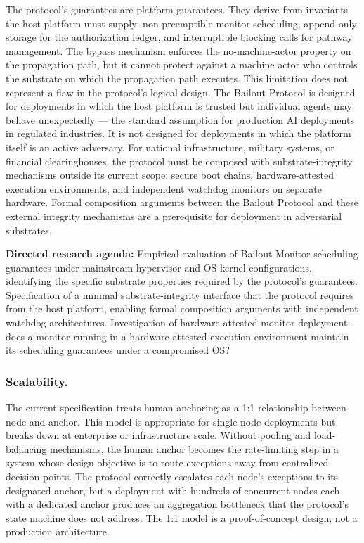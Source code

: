 The protocol's guarantees are platform guarantees. They derive from invariants the host platform must supply: non-preemptible monitor scheduling, append-only storage for the authorization ledger, and interruptible blocking calls for pathway management. The bypass mechanism enforces the no-machine-actor property on the propagation path, but it cannot protect against a machine actor who controls the substrate on which the propagation path executes. This limitation does not represent a flaw in the protocol's logical design. The Bailout Protocol is designed for deployments in which the host platform is trusted but individual agents may behave unexpectedly --- the standard assumption for production AI deployments in regulated industries. It is not designed for deployments in which the platform itself is an active adversary. For national infrastructure, military systems, or financial clearinghouses, the protocol must be composed with substrate-integrity mechanisms outside its current scope: secure boot chains, hardware-attested execution environments, and independent watchdog monitors on separate hardware. Formal composition arguments between the Bailout Protocol and these external integrity mechanisms are a prerequisite for deployment in adversarial substrates.

\textbf{Directed research agenda:} Empirical evaluation of Bailout Monitor scheduling guarantees under mainstream hypervisor and OS kernel configurations, identifying the specific substrate properties required by the protocol's guarantees. Specification of a minimal substrate-integrity interface that the protocol requires from the host platform, enabling formal composition arguments with independent watchdog architectures. Investigation of hardware-attested monitor deployment: does a monitor running in a hardware-attested execution environment maintain its scheduling guarantees under a compromised OS?

\subsubsection{Scalability.}\label{sec:scalability-limitation}

The current specification treats human anchoring as a 1:1 relationship between node and anchor. This model is appropriate for single-node deployments but breaks down at enterprise or infrastructure scale. Without pooling and load-balancing mechanisms, the human anchor becomes the rate-limiting step in a system whose design objective is to route exceptions away from centralized decision points. The protocol correctly escalates each node's exceptions to its designated anchor, but a deployment with hundreds of concurrent nodes each with a dedicated anchor produces an aggregation bottleneck that the protocol's state machine does not address. The 1:1 model is a proof-of-concept design, not a production architecture.

